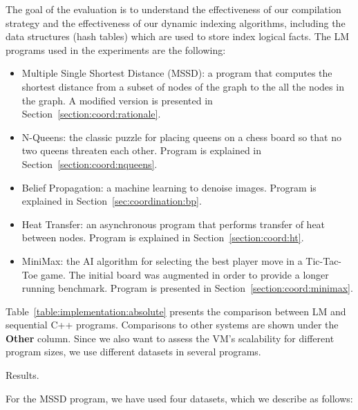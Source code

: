 The goal of the evaluation is to understand the effectiveness of our compilation
strategy and the effectiveness of our dynamic indexing algorithms, including the
data structures (hash tables) which are used to store index logical facts. The
LM programs used in the experiments are the following:

\begin{itemize}
   \item Multiple Single Shortest Distance (MSSD): a program that computes the
      shortest distance from a subset of nodes of the graph to the all the nodes
      in the graph. A modified version is presented in
      Section~\ref{section:coord:rationale}.

   \item N-Queens: the classic puzzle for placing queens on a chess board so
      that no two queens threaten each other. Program is explained in
      Section~\ref{section:coord:nqueens}.

   \item Belief Propagation: a machine learning to denoise images. Program is
      explained in Section~\ref{sec:coordination:bp}.

    \item Heat Transfer: an asynchronous program that performs transfer of heat
       between nodes. Program is explained in Section~\ref{section:coord:ht}.

    \item MiniMax: the AI algorithm for selecting the best player move in a
       Tic-Tac-Toe game. The initial board was augmented in order to provide a
       longer running benchmark. Program is presented in
       Section~\ref{section:coord:minimax}.
\end{itemize}

Table~\ref{table:implementation:absolute} presents the comparison between LM and
sequential C++ programs. Comparisons to other systems are shown under the
\textbf{Other} column. Since we also want to assess the VM's scalability for
different program sizes, we use different datasets in several programs.

\begin{table}[ht]
   \begin{center}
      
   \end{center}
   \caption{Results.}
   \label{table:implementation:absolute}
\end{table}

For the MSSD program, we have used four datasets, which we describe as follows:

